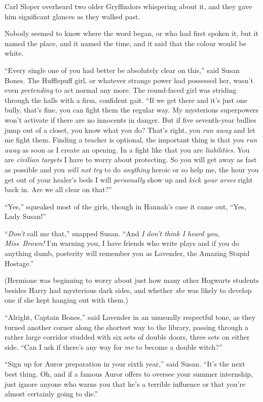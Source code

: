 Carl Sloper overheard two older Gryffindors whispering about it, and they gave him significant glances as they walked past.

Nobody seemed to know where the word began, or who had first spoken it, but it named the place, and it named the time, and it said that the colour would be white.

\later

“Every single one of you had better be absolutely clear on this,” said Susan Bones. The Hufflepuff girl, or whatever strange power had possessed her, wasn’t even \emph{pretending} to act normal any more. The round-faced girl was striding through the halls with a firm, confident gait. “If we get there and it’s just one bully, that’s fine, you can fight them the regular way. My mysterious superpowers won’t activate if there are no innocents in danger. But if five seventh-year bullies jump out of a closet, you know what you do? That’s right, you \emph{run away} and let me fight them. Finding a teacher is optional, the important thing is that you \emph{run away} as soon as I create an opening. In a fight like that you are \emph{liabilities}. You are \emph{civilian targets} I have to worry about protecting. So you will get away as fast as possible and you \emph{will not try} to do \emph{anything} heroic or so help me, the hour you get out of your healer’s beds I will \emph{personally} show up and \emph{kick your arses} right back in. Are we all clear on that?”

“Yes,” squeaked most of the girls, though in Hannah’s case it came out, “Yes, Lady Susan!”

“\emph{Don’t} call me that,” snapped Susan. “And \emph{I don’t think I heard you, Miss~Brown!} I’m warning you, I have friends who write plays and if you do anything dumb, posterity will remember you as Lavender, the Amazing Stupid Hostage.”

(Hermione was beginning to worry about just how many other Hogwarts students besides Harry had mysterious dark sides, and whether \emph{she} was likely to develop one if she kept hanging out with them.)

“Alright, Captain Bones,” said Lavender in an unusually respectful tone, as they turned another corner along the shortest way to the library, passing through a rather large corridor studded with six sets of double doors, three sets on either side. “Can I ask if there’s any way for \emph{me} to become a double witch?”

“Sign up for Auror preparation in your sixth year,” said Susan. “It’s the next best thing. Oh, and if a famous Auror offers to oversee your summer internship, just ignore anyone who warns you that he’s a terrible influence or that you’re almost certainly going to die.”


